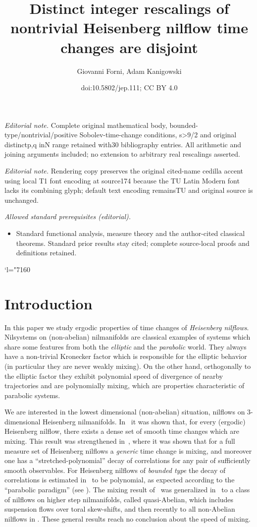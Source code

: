 \documentclass[10pt]{amsart}
\title{Distinct integer rescalings of nontrivial Heisenberg nilflow time changes are disjoint}
\author{Giovanni Forni, Adam Kanigowski}
\date{doi:10.5802/jep.111; CC BY 4.0}
\newcommand{\Changel}{\mathcode`l="7160}
\theoremstyle{definition}
\theoremstyle{plain}
\begin{document}
\maketitle
\noindent\textit{Editorial note.} Complete original mathematical body, bounded-type/nontrivial/positive Sobolev-time-change conditions, s>9/2 and original distinctp,q inN range retained with30 bibliography entries. All arithmetic and joining arguments included; no extension to arbitrary real rescalings asserted.\par\medskip
\noindent\textit{Editorial note.} Rendering copy preserves the original cited-name cedilla accent using local T1 font encoding at source174 because the TU Latin Modern font lacks its combining glyph; default text encoding remainsTU and original source is unchanged.\par\medskip
\noindent\textit{Allowed standard prerequisites (editorial).}\begin{itemize}
\item Standard functional analysis, measure theory and the author-cited classical theorems. Standard prior results stay cited; complete source-local proofs and definitions retained.
\end{itemize}\medskip
\tableofcontents


\Changel
\section{Introduction}
In this paper we study ergodic properties of time changes of \emph{Heisenberg nilflows}. Nilsystems on (non-abelian) nilmanifolds are classical examples of systems which share some features from both the \emph{elliptic} and the \emph{parabolic} world. They always have a non-trivial Kronecker factor which is responsible for the elliptic behavior (in particular they are never weakly mixing). On the other hand, orthogonally to the elliptic factor they exhibit
polynomial speed of divergence of nearby trajectories and are polynomially mixing, which are properties characteristic of parabolic systems.

We are interested in the lowest dimensional (non-abelian) situation, \ie nilflows on $3$-dimensional Heisenberg nilmanifolds. In~\cite{AFU} it was shown that, for every (\hbox{ergodic}) Heisenberg nilflow, there exists a dense set of smooth time changes which are mixing. This result was strengthened in~\cite{FK}, where it was shown that for a full measure set of Heisenberg nilflows a \emph{generic} time change is mixing, and moreover one has a ``stretched-polynomial'' decay of correlations for any pair of sufficiently smooth observables. For Heisenberg nilflows of \emph{bounded type} the decay of correlations is estimated in~\cite{FK} to be polynomial, as expected according to the
``parabolic paradigm'' (see \cite[\S8.2.f]{HK}). The mixing result of~\cite{AFU} was generalized in~\cite{Rav} to a class of nilflows on higher step nilmanifolds, called quasi-Abelian, which includes suspension flows over toral skew-shifts, and then recently to all non-Abelian nilflows in \cite{AFRU}. These general results reach no conclusion about the speed of mixing.
\end{document}
